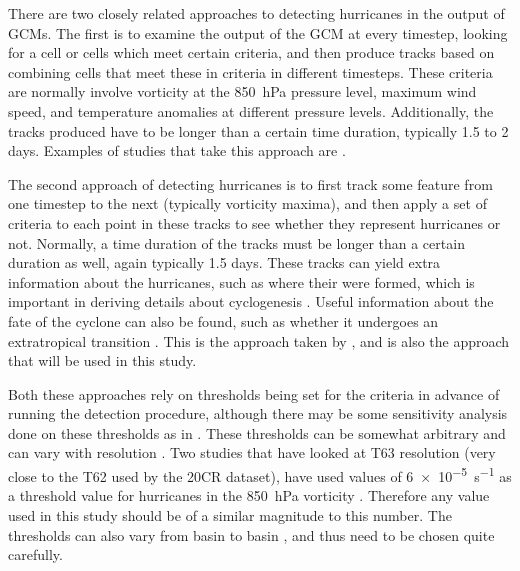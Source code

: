 \documentclass[pdftex,12pt,a4paper]{report}
\begin{document}
There are two closely related approaches to detecting hurricanes in the output of GCMs. The first is
to examine the output of the GCM at every timestep, looking for a cell or cells which meet certain
criteria, and then produce tracks based on combining cells that meet these in criteria in different
timesteps. These criteria are normally involve vorticity at the \SI{850}{hPa} pressure level,
maximum wind speed, and temperature anomalies at different pressure levels. Additionally, the tracks
produced have to be longer than a certain time duration, typically 1.5 to 2 days. Examples of
studies that take this approach are \textcite{bengtsson1995hurricane, walsh1997objective}.

The second approach of detecting hurricanes is to first track some feature from one timestep to the
next (typically vorticity maxima), and then apply a set of criteria to each point in these tracks to
see whether they represent hurricanes or not. Normally, a time duration of the tracks must be longer
than a certain duration as well, again typically 1.5 days. These tracks can yield extra information
about the hurricanes, such as where their were formed, which is important in deriving details about
cyclogenesis \parencite{marchok2002ncep}. Useful information about the fate of the cyclone can also
be found, such as whether it undergoes an extratropical transition \parencite{hart2001climatology,
studholme2014objective}. This is the approach taken by \textcite{hodges1994general,
hodges1999adaptive, camargo2002improving}, and is also the approach that will be used in this study.

Both these approaches rely on thresholds being set for the criteria in advance of running the
detection procedure, although there may be some sensitivity analysis done on these thresholds as in
\textcite{walsh1997objective}. These thresholds can be somewhat arbitrary and can vary with resolution
\parencite{walsh2007objectively}. Two studies that have looked at T63 resolution (very close to the T62 used by
the 20CR dataset), have used values of \SI{6e-5}{s^{-1}} as a threshold value for hurricanes in the
\SI{850}{hPa} vorticity \parencite{bengtsson2006storm, bengtsson2007may}. Therefore any value used in this
study should be of a similar magnitude to this number. The thresholds can also vary from basin to
basin \parencite{camargo2002improving}, and thus need to be chosen quite carefully.
\end{document}
